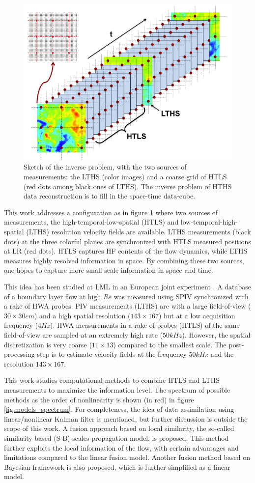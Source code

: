 \begin{figure}
\centering
	\includegraphics[width=0.5\columnwidth]{./images/probdef/setups/problem_config.png}
	\caption{\label{fig:space-time_measurements} Sketch of the inverse problem, with the two sources of measurements: the LTHS (color images) and a coarse grid of HTLS (red dots among black ones of LTHS). The inverse problem of HTHS data reconstruction is to fill in the space-time data-cube.}
\end{figure}

This work addresses a configuration as in figure \ref{fig:space-time_measurements} where two sources of measurements, the high-temporal-low-spatial (HTLS) and low-temporal-high-spatial (LTHS) resolution velocity fields are available. LTHS measurements (black dots) at the three colorful planes are synchronized with HTLS measured positions at LR (red dots). HTLS captures HF contents of the flow dynamics, while LTHS measures highly resolved information in space. By combining these two sources, one hopes to capture more small-scale information in space and time. 

This idea has been studied at LML in an European joint experiment \citep{coudert2011double}. A database of a boundary layer flow at high $ Re $ was measured using SPIV synchronized with a rake of HWA probes. PIV measurements (LTHS) are with a large field-of-view ($ 30 \times 30 cm $) and a high spatial resolution ($ 143 \times 167 $) but at a low acquisition frequency ($ 4 Hz $). HWA measurements in a rake of probes (HTLS) of the same field-of-view are sampled at an extremely high rate ($ 50 kHz $). However, the spatial discretization is very coarse ($ 11 \times 13 $) compared to the smallest scale. The post-processing step is to estimate velocity fields at the frequency $ 50 kHz$ and the resolution $ 143 \times 167 $.

This work studies computational methods to combine HTLS and LTHS measurements to maximize the information level. The spectrum of possible methods as the order of nonlinearity is shown (in red) in figure \ref{fig:models_spectrum}. For completeness, the idea of data assimilation using linear/nonlinear Kalman filter is mentioned, but further discussion is outside the scope of this work. A fusion approach based on local similarity, the so-called similarity-based (S-B) scales propagation model, is proposed. This method further exploits the local information of the flow, with certain advantages and limitations compared to the linear fusion model. Another fusion method based on Bayesian framework is also proposed, which is further simplified as a linear model.

